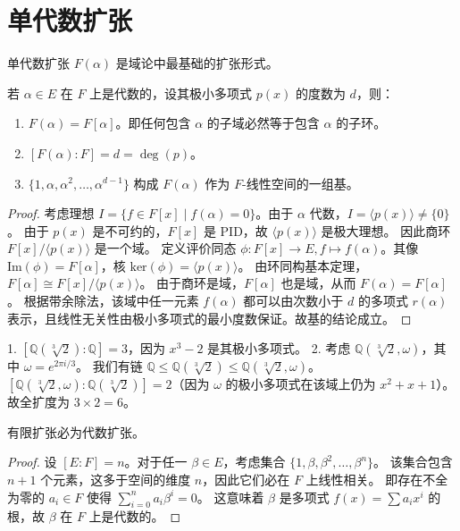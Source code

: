 \documentclass[11pt]{article}
\begin{document}
\section{单代数扩张}

单代数扩张 $F(\alpha)$ 是域论中最基础的扩张形式。

\begin{cntheorem}[单代数扩张的性质]
若 $\alpha \in E$ 在 $F$ 上是代数的，设其极小多项式 $p(x)$ 的度数为 $d$，则：
\begin{enumerate}
    \item $F(\alpha) = F[\alpha]$。即任何包含 $\alpha$ 的子域必然等于包含 $\alpha$ 的子环。
    \item $[F(\alpha):F] = d = \deg(p)$。
    \item $\{1, \alpha, \alpha^2, \dots, \alpha^{d-1}\}$ 构成 $F(\alpha)$ 作为 $F$-线性空间的一组基。
\end{enumerate}
\end{cntheorem}

\begin{proof}
考虑理想 $I = \{f \in F[x] \mid f(\alpha) = 0\}$。由于 $\alpha$ 代数，$I = \langle p(x) \rangle \neq \{0\}$。
由于 $p(x)$ 是不可约的，$F[x]$ 是 PID，故 $\langle p(x) \rangle$ 是极大理想。
因此商环 $F[x]/\langle p(x) \rangle$ 是一个域。
定义评价同态 $\phi: F[x] \to E, f \mapsto f(\alpha)$。其像 $\text{Im}(\phi) = F[\alpha]$，核 $\text{ker}(\phi) = \langle p(x) \rangle$。
由环同构基本定理，$F[\alpha] \cong F[x]/\langle p(x) \rangle$。
由于商环是域，$F[\alpha]$ 也是域，从而 $F(\alpha) = F[\alpha]$。
根据带余除法，该域中任一元素 $f(\alpha)$ 都可以由次数小于 $d$ 的多项式 $r(\alpha)$ 表示，且线性无关性由极小多项式的最小度数保证。故基的结论成立。
\end{proof}

\begin{cnexample}
1. $[\mathbb{Q}(\sqrt[3]{2}) : \mathbb{Q}] = 3$，因为 $x^3 - 2$ 是其极小多项式。
2. 考虑 $\mathbb{Q}(\sqrt[3]{2}, \omega)$，其中 $\omega = e^{2\pi i / 3}$。
我们有链 $\mathbb{Q} \le \mathbb{Q}(\sqrt[3]{2}) \le \mathbb{Q}(\sqrt[3]{2}, \omega)$。
$[\mathbb{Q}(\sqrt[3]{2}, \omega) : \mathbb{Q}(\sqrt[3]{2})] = 2$（因为 $\omega$ 的极小多项式在该域上仍为 $x^2 + x + 1$）。
故全扩度为 $3 \times 2 = 6$。
\end{cnexample}

\begin{cntheorem}
有限扩张必为代数扩张。
\end{cntheorem}
\begin{proof}
设 $[E:F] = n$。对于任一 $\beta \in E$，考虑集合 $\{1, \beta, \beta^2, \dots, \beta^n\}$。
该集合包含 $n+1$ 个元素，这多于空间的维度 $n$，因此它们必在 $F$ 上线性相关。
即存在不全为零的 $a_i \in F$ 使得 $\sum_{i=0}^n a_i \beta^i = 0$。
这意味着 $\beta$ 是多项式 $f(x) = \sum a_i x^i$ 的根，故 $\beta$ 在 $F$ 上是代数的。
\end{proof}
\end{document}
